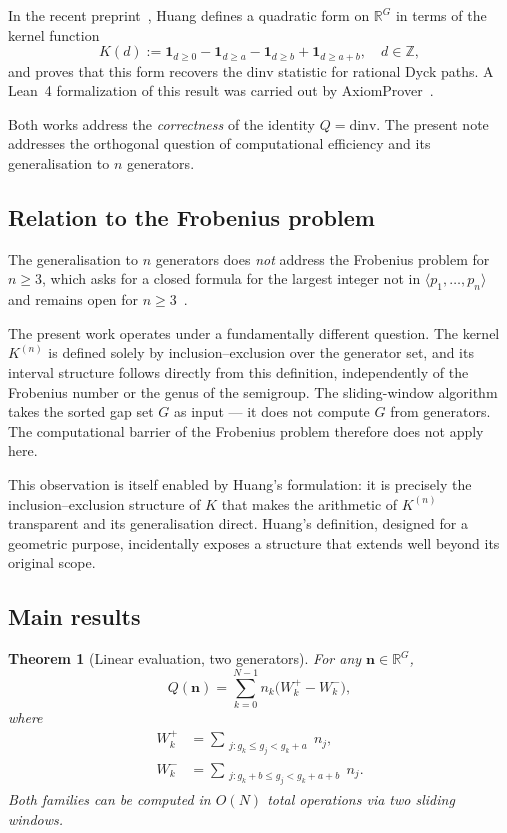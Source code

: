 \documentclass[11pt,a4paper]{amsart}
\theoremstyle{plain}
\newtheorem{theorem}{Theorem}[section]
\theoremstyle{definition}
\theoremstyle{remark}
\begin{document}
In the recent preprint~\cite{Huang2026}, Huang defines a quadratic form
on $\mathbb{R}^G$ in terms of the kernel function
\[
  K(d) := \mathbf{1}_{d \geq 0} - \mathbf{1}_{d \geq a}
         - \mathbf{1}_{d \geq b} + \mathbf{1}_{d \geq a+b}, \quad d \in \mathbb{Z},
\]
and proves that this form recovers the $\mathrm{dinv}$ statistic for rational
Dyck paths. A Lean~4 formalization of this result was carried out by
AxiomProver~\cite{AxiomProver2026}.

Both works address the \emph{correctness} of the identity $Q = \mathrm{dinv}$.
The present note addresses the orthogonal question of computational efficiency
and its generalisation to $n$ generators.

\subsection*{Relation to the Frobenius problem}

The generalisation to $n$ generators does \emph{not} address the
Frobenius problem for $n \geq 3$, which asks for a closed formula
for the largest integer not in $\langle p_1,\ldots,p_n \rangle$
and remains open for $n \geq 3$~\cite{Ramirez2005}.

The present work operates under a fundamentally different question.
The kernel $K^{(n)}$ is defined solely by inclusion--exclusion over
the generator set, and its interval structure follows directly from
this definition, independently of the Frobenius number or the genus
of the semigroup. The sliding-window algorithm takes the sorted gap
set $G$ as input --- it does not compute $G$ from generators.
The computational barrier of the Frobenius problem therefore does
not apply here.

This observation is itself enabled by Huang's formulation: it is
precisely the inclusion--exclusion structure of $K$ that makes the
arithmetic of $K^{(n)}$ transparent and its generalisation direct.
Huang's definition, designed for a geometric purpose, incidentally
exposes a structure that extends well beyond its original scope.

\subsection*{Main results}

\begin{theorem}[Linear evaluation, two generators]
\label{thm:main}
For any $\mathbf{n} \in \mathbb{R}^G$,
\[
  Q(\mathbf{n}) = \sum_{k=0}^{N-1} n_k \bigl(W^+_k - W^-_k\bigr),
\]
where
\begin{align*}
  W^+_k &= \sum_{\substack{j : g_k \leq g_j < g_k + a}} n_j, \\
  W^-_k &= \sum_{\substack{j : g_k + b \leq g_j < g_k + a + b}} n_j.
\end{align*}
Both families can be computed in $O(N)$ total operations via two sliding windows.
\end{theorem}
\end{document}

